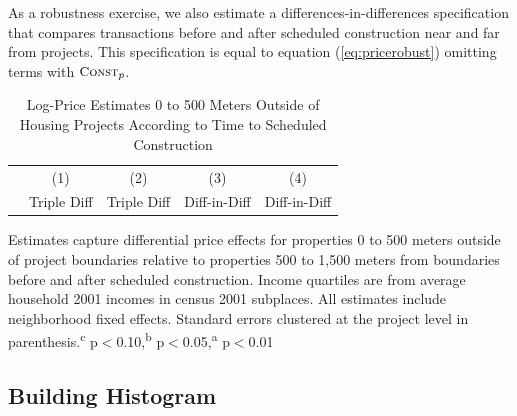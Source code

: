 \documentclass[12pt]{article}
\begin{document}
As a robustness exercise, we also estimate a differences-in-differences specification that compares transactions before and after scheduled construction near and far from projects.  This specification is equal to equation (\ref{eq:pricerobust}) omitting terms with $\textsc{\small Const}_{p}$.  

\begin{table}
\small
\centering
\caption{Log-Price Estimates 0 to 500 Meters Outside of Housing Projects According to Time to Scheduled Construction }\label{table:pricerobust}
\vspace{-1mm}
\begin{threeparttable}
\begin{tabular}{lCCCC}
\toprule
 & \small (1) & \small (2) & \small (3) & \small (4)   \\ 
  & \small Triple Diff & \small Triple Diff &\small Diff-in-Diff & \small Diff-in-Diff \\ \midrule 
  \bottomrule
\end{tabular}
\begin{tablenotes}
\item \footnotesize Estimates capture differential price effects for properties  0 to 500 meters outside of project boundaries relative to   properties 500 to 1,500 meters from boundaries before and after scheduled construction.  Income quartiles are from average household 2001 incomes in census 2001 subplaces.  All estimates include neighborhood fixed effects.  Standard errors clustered at the project level in parenthesis.\textsuperscript{c} p$<$0.10,\textsuperscript{b} p$<$0.05,\textsuperscript{a} p$<$0.01 
\end{tablenotes}
\end{threeparttable}
\end{table} 

\subsection{Building Histogram}\label{section:appendixbuildhist}
\end{document}
